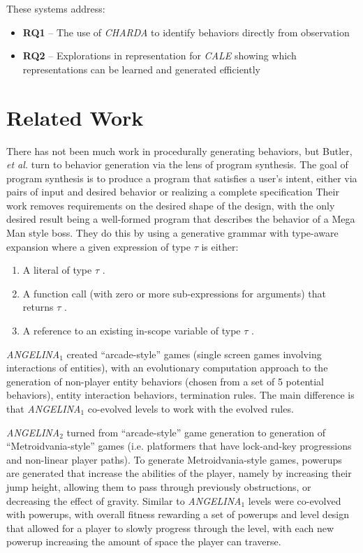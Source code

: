 \documentclass[12pt]{report}
\begin{document}
These systems address:

\begin{itemize}
\item \textbf{RQ1} -- The use of \textit{CHARDA} to identify behaviors directly from observation
\item \textbf{RQ2} -- Explorations in representation for \textit{CALE} showing which representations can be learned and generated efficiently
\end{itemize}

\section*{Related Work}

There has not been much work in procedurally generating behaviors, but Butler, \textit{et al.} \cite{Butler:2017:PSG:3102071.3102076} turn to behavior generation via the lens of program synthesis. The goal of program synthesis is to produce a program that satisfies a user's intent, either via pairs of input and desired behavior \cite{polozov2015flashmeta} or realizing a complete specification \cite{Schkufza:2013:SS:2499368.2451150} Their work removes requirements on the desired shape of the design, with the only desired result being a well-formed program that describes the behavior of a Mega Man style boss.  They do this by using a generative grammar with type-aware expansion where a given expression of type $\tau$ is either:
\begin{enumerate}
\item A literal of type $\tau$ .
\item A function call (with zero or more sub-expressions for
arguments) that returns $\tau$ .
\item A reference to an existing in-scope variable of type $\tau$ .
\end{enumerate}

\textit{ANGELINA}$_{1}$ created ``arcade-style'' games (single screen games involving interactions of entities), with an evolutionary computation approach to the generation of non-player entity behaviors (chosen from a set of 5 potential behaviors), entity interaction behaviors, termination rules. The main difference is that \textit{ANGELINA}$_{1}$  co-evolved levels to work with the evolved rules.

\textit{ANGELINA}$_{2}$ turned from ``arcade-style'' game generation to generation of ``Metroidvania-style'' games (i.e. platformers that 
have lock-and-key progressions and non-linear player paths).  To generate Metroidvania-style games, powerups are generated that increase the abilities of the player, namely by increasing their jump height, allowing them to pass through previously obstructions, or decreasing the effect of gravity.  Similar to \textit{ANGELINA}$_{1}$ levels were co-evolved with powerups, with overall fitness rewarding a set of powerups and level design that allowed for a player to slowly progress through the level, with each new powerup increasing the amount of space the player can traverse.
\end{document}
